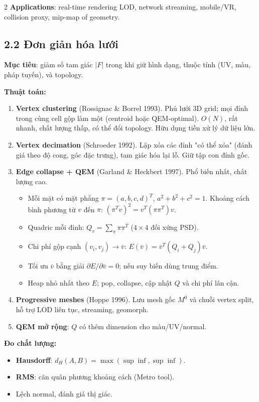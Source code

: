 \begin{paracol}{2}
\textbf{Applications}: real-time rendering LOD, network streaming, mobile/VR, collision proxy, mip-map of geometry.

\switchcolumn

\subsection*{2.2 Đơn giản hóa lưới}
\textbf{Mục tiêu}: giảm số tam giác $|F|$ trong khi giữ hình dạng, thuộc tính (UV, màu, pháp tuyến), và topology.

\textbf{Thuật toán:}
\begin{enumerate}[leftmargin=*,nosep]
  \item \textbf{Vertex clustering} (Rossignac \& Borrel 1993). Phủ lưới 3D grid; mọi đỉnh trong cùng cell gộp làm một (centroid hoặc QEM-optimal). $O(N)$, rất nhanh, chất lượng thấp, có thể đổi topology. Hữu dụng tiền xử lý dữ liệu lớn.
  \item \textbf{Vertex decimation} (Schroeder 1992). Lặp xóa các đỉnh "có thể xóa" (đánh giá theo độ cong, góc đặc trưng), tam giác hóa lại lỗ. Giữ tập con đỉnh gốc.
  \item \textbf{Edge collapse + QEM} (Garland \& Heckbert 1997). Phổ biến nhất, chất lượng cao.
    \begin{itemize}[leftmargin=1.2em,nosep]
      \item Mỗi mặt có mặt phẳng $\pi=(a,b,c,d)^T$, $a^2+b^2+c^2=1$. Khoảng cách bình phương từ $v$ đến $\pi$: $(\pi^T v)^2 = v^T(\pi\pi^T)v$.
      \item Quadric mỗi đỉnh: $Q_v=\sum_\pi \pi\pi^T$ ($4{\times}4$ đối xứng PSD).
      \item Chi phí gộp cạnh $(v_i,v_j)\to\bar v$: $E(\bar v)=\bar v^T(Q_i+Q_j)\bar v$.
      \item Tối ưu $\bar v$ bằng giải $\partial E/\partial \bar v=0$; nếu suy biến dùng trung điểm.
      \item Heap nhỏ nhất theo $E$; pop, collapse, cập nhật $Q$ và chi phí lân cận.
    \end{itemize}
  \item \textbf{Progressive meshes} (Hoppe 1996). Lưu mesh gốc $M^0$ và chuỗi vertex split, hỗ trợ LOD liên tục, streaming, geomorph.
  \item \textbf{QEM mở rộng}: $Q$ có thêm dimension cho màu/UV/normal.
\end{enumerate}

\textbf{Đo chất lượng:}
\begin{itemize}[leftmargin=*,nosep]
  \item \textbf{Hausdorff}: $d_H(A,B)=\max(\sup\inf,\sup\inf)$.
  \item \textbf{RMS}: căn quân phương khoảng cách (Metro tool).
  \item Lệch normal, đánh giá thị giác.
\end{itemize}


\end{paracol}
